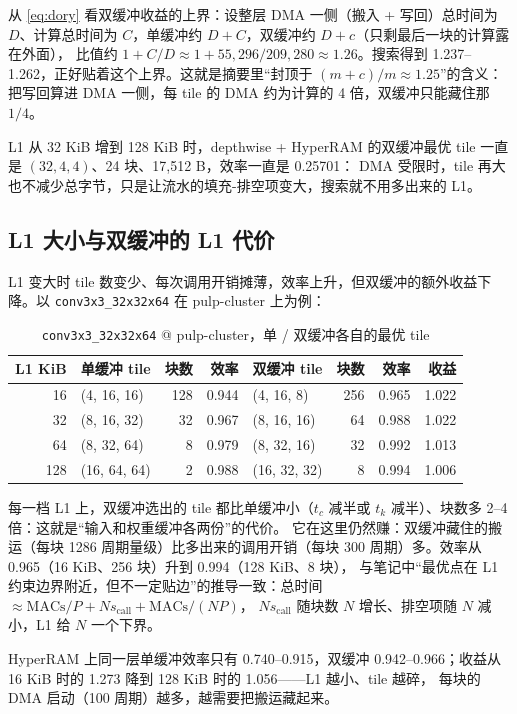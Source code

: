 \documentclass[11pt,a4paper]{ctexart}
\begin{document}
从 \cref{eq:dory} 看双缓冲收益的上界：设整层 DMA 一侧（搬入 + 写回）总时间为 $D$、计算总时间为 $C$，单缓冲约 $D + C$，双缓冲约 $D + c$（只剩最后一块的计算露在外面），
比值约 $1 + C/D\approx1 + 55{,}296/209{,}280\approx1.26$。搜索得到 1.237--1.262，正好贴着这个上界。这就是摘要里“封顶于 $(m+c)/m\approx1.25$”的含义：
把写回算进 DMA 一侧，每 tile 的 DMA 约为计算的 4 倍，双缓冲只能藏住那 $1/4$。

L1 从 32 KiB 增到 128 KiB 时，depthwise + HyperRAM 的双缓冲最优 tile 一直是 $(32, 4, 4)$、24 块、17,512 B，效率一直是 0.25701：
DMA 受限时，tile 再大也不减少总字节，只是让流水的填充-排空项变大，搜索就不用多出来的 L1。

\subsection{L1 大小与双缓冲的 L1 代价}

L1 变大时 tile 数变少、每次调用开销摊薄，效率上升，但双缓冲的额外收益下降。以 \texttt{conv3x3\_32x32x64} 在 pulp-cluster 上为例：

\begin{table}[H]
\centering\small
\caption{\texttt{conv3x3\_32x32x64} @ pulp-cluster，单 / 双缓冲各自的最优 tile}\label{tab:l1sweep}
\begin{tabular}{rlrrlrrr}
\toprule
L1 KiB & 单缓冲 tile & 块数 & 效率 & 双缓冲 tile & 块数 & 效率 & 收益 \\
\midrule
16 & (4, 16, 16) & 128 & 0.944 & (4, 16, 8) & 256 & 0.965 & 1.022 \\
32 & (8, 16, 32) & 32 & 0.967 & (8, 16, 16) & 64 & 0.988 & 1.022 \\
64 & (8, 32, 64) & 8 & 0.979 & (8, 32, 16) & 32 & 0.992 & 1.013 \\
128 & (16, 64, 64) & 2 & 0.988 & (16, 32, 32) & 8 & 0.994 & 1.006 \\
\bottomrule
\end{tabular}
\end{table}

每一档 L1 上，双缓冲选出的 tile 都比单缓冲小（$t_c$ 减半或 $t_k$ 减半）、块数多 2--4 倍：这就是“输入和权重缓冲各两份”的代价。
它在这里仍然赚：双缓冲藏住的搬运（每块 1286 周期量级）比多出来的调用开销（每块 300 周期）多。效率从 0.965（16 KiB、256 块）升到 0.994（128 KiB、8 块），
与笔记中“最优点在 L1 约束边界附近，但不一定贴边”的推导一致：总时间 $\approx \text{MACs}/P + N s_{\text{call}} + \text{MACs}/(NP)$，
$N s_{\text{call}}$ 随块数 $N$ 增长、排空项随 $N$ 减小，L1 给 $N$ 一个下界。

HyperRAM 上同一层单缓冲效率只有 0.740--0.915，双缓冲 0.942--0.966；收益从 16 KiB 时的 1.273 降到 128 KiB 时的 1.056——L1 越小、tile 越碎，
每块的 DMA 启动（100 周期）越多，越需要把搬运藏起来。
\end{document}
